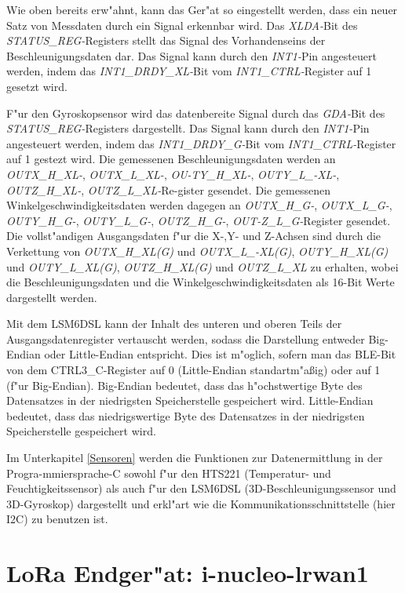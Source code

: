 Wie oben bereits erw"ahnt, kann das Ger"at so eingestellt werden, 
dass ein neuer Satz von Messdaten durch ein Signal erkennbar wird. Das 
\textit{XLDA-}Bit des \textit{STATUS\_REG-}Registers stellt das Signal
des Vorhandenseins der Beschleunigungsdaten dar.
Das Signal kann durch den \textit{INT1-}Pin angesteuert werden, 
indem  das \textit{INT1\_DRDY\_XL-}Bit vom 
\textit{INT1\_CTRL-}Register auf 1 gesetzt wird. 

F"ur den Gyroskopsensor wird das datenbereite Signal durch das
\textit{GDA-}Bit des \textit{STATUS\_REG-}Registers dargestellt.
Das Signal kann durch den 
\textit{INT1-}Pin angesteuert werden, indem  das 
\textit{INT1\_DRDY\_G-}Bit vom \textit{INT1\_CTRL-}Register auf 1 
gestezt wird. Die gemessenen Beschleunigungsdaten werden an 
\textit{OUTX\_H\_XL-}, \textit{OUTX\_L\_XL-}, \textit{OU-TY\_H\_XL-}, 
\textit{OUTY\_L\_-XL-}, \textit{OUTZ\_H\_XL-}, 
\textit{OUTZ\_L\_XL-}Re-gister gesendet. Die gemessenen 
Winkelgeschwindigkeitsdaten werden dagegen an \textit{OUTX\_H\_G-}, 
\textit{OUTX\_L\_G-}, \textit{OUTY\_H\_G-}, \textit{OUTY\_L\_G-}, 
\textit{OUTZ\_H\_G-}, \textit{OUT-Z\_L\_G-}Register gesendet. Die 
vollst"andigen Ausgangsdaten f"ur die X-,Y- und Z-Achsen sind durch 
die Verkettung von \textit{OUTX\_H\_XL(G)} und 
\textit{OUTX\_L\_-XL(G)}, \textit{OUTY\_H\_XL(G)} und 
\textit{OUTY\_L\_XL(G)}, \textit{OUTZ\_H\_XL(G)} und 
\textit{OUTZ\_L\_XL} zu erhalten, wobei die Beschleunigungsdaten und 
die Winkelgeschwindigkeitsdaten als 16-Bit Werte dargestellt werden.

Mit dem LSM6DSL kann der Inhalt des unteren und oberen Teils der 
Ausgangsdatenregister vertauscht werden, sodass die Darstellung entweder 
Big-Endian oder Little-Endian entspricht. Dies ist m"oglich, sofern 
man das BLE-Bit von dem CTRL3\_C-Register auf 0 (Little-Endian 
standartm"a\ss{}ig) oder auf 1 (f"ur Big-Endian). Big-Endian bedeutet, 
dass das h"ochstwertige Byte des Datensatzes in der niedrigsten 
Speicherstelle gespeichert wird. Little-Endian bedeutet, dass das 
niedrigswertige Byte des Datensatzes in der niedrigsten Speicherstelle 
gespeichert wird.


Im Unterkapitel \ref{Sensoren} werden die Funktionen zur 
Datenermittlung in der Progra-mmiersprache-C sowohl f"ur den HTS221 
(Temperatur- und Feuchtigkeitssensor) als auch f"ur den LSM6DSL 
(3D-Beschleunigungssensor und 3D-Gyroskop) dargestellt und erkl"art wie 
die Kommunikationsschnittstelle (hier I2C) zu benutzen ist.


\section{LoRa Endger"at: i-nucleo-lrwan1}\label{LoRa Modul}

